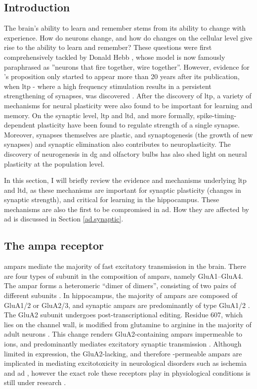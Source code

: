 \subsection{Introduction}
The brain's ability to learn and remember stems from its ability to change with experience. How do neurons change, and how do changes on the cellular level give rise to the ability to learn and remember? These questions were first comprehensively tackled by Donald Hebb \citeyear{hebb49}, whose model is now famously paraphrased as ''neurons that fire together, wire together''. However, evidence for \citet{hebb49}'s proposition only started to appear more than 20 years after its publication, when \gls{ltp} - where a high frequency stimulation results in a persistent strengthening of synapses, was discovered \citep{bliss73}. After the discovery of \gls{ltp}, a variety of mechanisms for neural plasticity were also found to be important for learning and memory. On the synaptic level, \gls{ltp} and \gls{ltd}, and more formally, spike-timing-dependent plasticity have been found to regulate strength of a single synapse. Moreover, synapses themselves are plastic, and synaptogenesis (the growth of new synapses) and synaptic elimination also contributes to neuroplasticity. The discovery of neurogenesis in \gls{dg} and olfactory bulbs has also shed light on neural plasticity at the population level.

In this section, I will briefly review the evidence and mechanisms underlying \gls{ltp} and \gls{ltd}, as these mechanisms are important for synaptic plasticity (changes in synaptic strength), and critical for learning in the hippocampus. These mechanisms are also the first to be compromised in \gls{ad}. How they are affected by \gls{ad} is discussed in Section \ref{ad.synaptic}. 

\subsection{The \gls{ampa} receptor}

\glspl{ampar} mediate the majority of fast excitatory transmission in the brain. There are four types of subunit in the composition of \glspl{ampar}, namely GluA1--GluA4. The \gls{ampar} forms a heteromeric ``dimer of dimers'', consisting of two pairs of different subunits \citep{ayalon01}. In hippocampus, the majority of \glspl{ampar} are composed of GluA1/2 or GluA2/3, and synaptic \glspl{ampar} are predominantly of type GluA1/2 \citep{wenthold96, lu09}. The GluA2 subunit undergoes post-transcriptional editing. Residue 607, which lies on the channel wall, is modified from glutamine to arginine in the majority of adult neurons \citep{greger03}. This change renders GluA2-containing \gls{ampar}s impermeable to  ions, and predominantly mediates excitatory synaptic transmission \citep{sommer91,swanson97}. Although limited in expression, the GluA2-lacking, and therefore -permeable \glspl{ampar} are implicated in mediating excitotoxicity in neurological disorders such as ischemia and \gls{ad} \citep{kwak06, whitehead17}, however the exact role these receptors play in physiological conditions is still under research \citep{whitehead17}.

